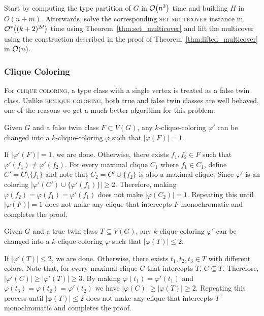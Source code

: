 \begin{tproof}
        Start by computing the type partition of $G$ in $\mathcal{O}\!\left(n^3\right)$ time and building $H$ in $O(n + m)$.
        Afterwards, solve the corresponding \textsc{set multicover} instance in $\mathcal{O}^*\!\left((k+2)^{2d}\right)$ time using Theorem~\ref{thm:set_multicover} and lift the multicover using the construction described in the proof of Theorem~\ref{thm:lifted_multicover} in $\mathcal{O}\!\left(n\right)$.
\end{tproof}

\subsubsection{Clique Coloring}

For \textsc{clique coloring}, a type class with a single vertex is treated as a false twin class.
Unlike \textsc{biclique coloring}, both true and false twin classes are well behaved, one of the reasons we get a much better algorithm for this problem.


\begin{lemma}
    \label{lem:clique_false_twins}
    Given $G$ and a false twin class $F \subset V(G)$, any  $k$-clique-coloring $\varphi'$ can be changed into a $k$-clique-coloring $\varphi$ such that $|\varphi(F)| = 1$.
\end{lemma}

    \begin{tproof}
    If $|\varphi'(F)| = 1$, we are done.
    Otherwise, there exists $f_1, f_2 \in F$ such that $\varphi'(f_1) \neq \varphi'(f_2)$.
    For every maximal clique $C_1$ where $f_1 \in C_1$, define $C' = C \setminus \{f_1\}$ and note that $C_2 = C' \cup \{f_2\}$ is also a maximal clique.
    Since $\varphi'$ is an  coloring $|\varphi'(C') \cup \{\varphi'(f_1)\}| \geq 2$.
    Therefore, making $\varphi(f_2) = \varphi(f_1) = \varphi'(f_1)$ does not make $|\varphi(C_2)| = 1$. 
    Repeating this until $|\varphi(F)| = 1$ does not make any clique that intercepts $F$ monochromatic and completes the proof.
    \end{tproof}
    
\begin{lemma}
    \label{lem:clique_true_twins}
    Given $G$ and  a true twin class $T \subseteq V(G)$, any  $k$-clique-coloring $\varphi'$ can be changed into a $k$-clique-coloring $\varphi$ such that $|\varphi(T)| \leq 2$.
\end{lemma}

\begin{tproof}
    If $|\varphi'(T)| \leq 2$, we are done.
    Otherwise, there exists $t_1, t_2, t_3 \in T$ with different colors.
    Note that, for every maximal clique $C$ that intercepts $T$, $C \subseteq T$.
    Therefore, $|\varphi'(C)| \geq |\varphi'(T)| \geq 3$.
    By making $\varphi(t_1) = \varphi'(t_1)$ and $\varphi(t_3) = \varphi(t_2) = \varphi'(t_2)$ we have $|\varphi(C)| \geq |\varphi(T)| \geq 2$.
    Repeating this process until $|\varphi(T)| \leq 2$ does not make any clique that intercepts $T$ monochromatic and completes the proof.
\end{tproof}

